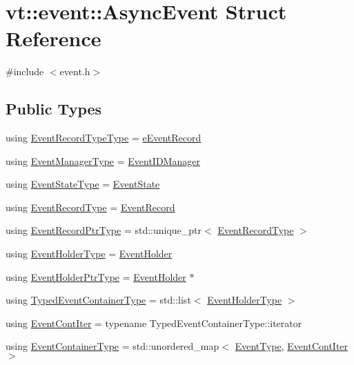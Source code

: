 \hypertarget{structvt_1_1event_1_1_async_event}{}\section{vt\+:\+:event\+:\+:Async\+Event Struct Reference}
\label{structvt_1_1event_1_1_async_event}


{\ttfamily \#include $<$event.\+h$>$}

\subsection*{Public Types}
\begin{DoxyCompactItemize}
\item 
using \hyperlink{structvt_1_1event_1_1_async_event_a4cf6f3c99e69b2efeb5fa9b3ffbcca4a}{Event\+Record\+Type\+Type} = \hyperlink{namespacevt_1_1event_a1ea9fec44d101bf40b8fd786d44ebed9}{e\+Event\+Record}
\item 
using \hyperlink{structvt_1_1event_1_1_async_event_a087519ac9e5ceaf317a2f6f583bfabd6}{Event\+Manager\+Type} = \hyperlink{structvt_1_1event_1_1_event_i_d_manager}{Event\+I\+D\+Manager}
\item 
using \hyperlink{structvt_1_1event_1_1_async_event_a35f2dfb3322fc042d4561ce1e119a0c8}{Event\+State\+Type} = \hyperlink{namespacevt_1_1event_a787aca6361696d96d817a639195c429c}{Event\+State}
\item 
using \hyperlink{structvt_1_1event_1_1_async_event_a5b4ef37db6e5962fdc0e6e0e56e74bc1}{Event\+Record\+Type} = \hyperlink{structvt_1_1event_1_1_event_record}{Event\+Record}
\item 
using \hyperlink{structvt_1_1event_1_1_async_event_a858268f301cb838d33d21cc66232803b}{Event\+Record\+Ptr\+Type} = std\+::unique\+\_\+ptr$<$ \hyperlink{structvt_1_1event_1_1_async_event_a5b4ef37db6e5962fdc0e6e0e56e74bc1}{Event\+Record\+Type} $>$
\item 
using \hyperlink{structvt_1_1event_1_1_async_event_a6b529d829ccb5b12c50c2b1978c41a86}{Event\+Holder\+Type} = \hyperlink{structvt_1_1event_1_1_event_holder}{Event\+Holder}
\item 
using \hyperlink{structvt_1_1event_1_1_async_event_aaa94fd7e3a63b17dc5b5e5751e5d05e8}{Event\+Holder\+Ptr\+Type} = \hyperlink{structvt_1_1event_1_1_event_holder}{Event\+Holder} $\ast$
\item 
using \hyperlink{structvt_1_1event_1_1_async_event_af0397f32fb9d7dd136c544737eeb7796}{Typed\+Event\+Container\+Type} = std\+::list$<$ \hyperlink{structvt_1_1event_1_1_async_event_a6b529d829ccb5b12c50c2b1978c41a86}{Event\+Holder\+Type} $>$
\item 
using \hyperlink{structvt_1_1event_1_1_async_event_a0f9634db3d6887c4a22076f6b9054e93}{Event\+Cont\+Iter} = typename Typed\+Event\+Container\+Type\+::iterator
\item 
using \hyperlink{structvt_1_1event_1_1_async_event_a391e9ac6236bd3dc5c884b8bc7e48257}{Event\+Container\+Type} = std\+::unordered\+\_\+map$<$ \hyperlink{namespacevt_a009267401def7ae8bf201892222d060f}{Event\+Type}, \hyperlink{structvt_1_1event_1_1_async_event_a0f9634db3d6887c4a22076f6b9054e93}{Event\+Cont\+Iter} $>$
\end{DoxyCompactItemize}
